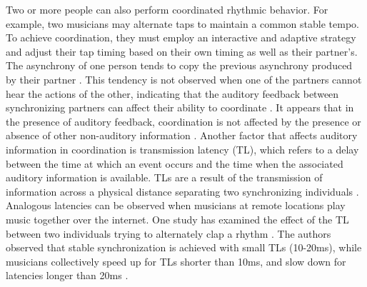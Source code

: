 \documentclass{report}
\begin{document}
Two or more people can also perform coordinated rhythmic behavior. For example, two musicians may alternate taps to maintain a common stable tempo. To achieve coordination, they must employ an interactive and adaptive strategy and adjust their tap timing based on their own timing as well as their partner's. The asynchrony of one person tends to copy the previous asynchrony produced by their partner \cite{nowicki2013mutual, konvalinka2010follow}. This tendency is not observed when one of the partners cannot hear the actions of the other, indicating that the auditory feedback between synchronizing partners can affect their ability to coordinate \cite{palmer201210}. It appears that in the presence of auditory feedback, coordination is not affected by the presence or absence of other non-auditory information \cite{nowicki2013mutual, marmelat2012strong}. Another factor that affects auditory information in coordination is transmission latency (TL), which refers to a delay between the time at which an event occurs and the time when the associated auditory information is available. TLs are a result of the transmission of information across a physical distance separating two synchronizing individuals \cite{chafe2010effect}. Analogous latencies can be observed when musicians at remote locations play music together over the internet. One study has examined the effect of the TL between two individuals trying to alternately clap a rhythm \cite{chafe2010effect}. The authors observed that stable synchronization is achieved with small TLs (10-20ms), while musicians collectively speed up for TLs shorter than 10ms, and slow down for latencies longer than 20ms \cite{chafe2010effect}.
\end{document}
